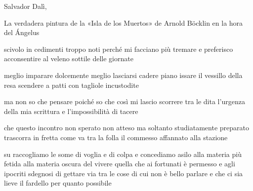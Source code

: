 \clearpage


\begin{artItem}
	Salvador Dalì, \begin{otherlanguage}{spanish}%
		La verdadera pintura de la «Isla de los Muertos» de Arnold Böcklin en la hora del Ángelus%
	\end{otherlanguage}
\end{artItem}

\begin{poem}
	\begin{stanza}
		scivolo in cedimenti troppo noti\verseline
		perché mi facciano più tremare\verseline
		e preferisco acconsentire\verseline
		al veleno sottile delle giornate
	\end{stanza}

	\begin{stanza}
		meglio imparare dolcemente\verseline
		meglio lasciarsi cadere piano\verseline
		issare il vessillo della resa\verseline
		scendere a patti con tagliole incustodite
	\end{stanza}

	\begin{stanza}
		ma non so che pensare\verseline
		poiché so che così mi lascio scorrere tra le dita\verseline
		l'urgenza della mia scrittura\verseline
		e l'impossibilità di tacere
	\end{stanza}
\end{poem}

\clearpage


\begin{poem}
	\begin{stanza}
		che questo incontro\verseline
		non sperato non atteso\verseline
		ma soltanto\verseline
		studiatamente preparato\verseline
		trascorra in fretta\verseline
		come va tra la folla\verseline
		il commesso affannato\verseline
		alla stazione
	\end{stanza}
\end{poem}

\clearpage


\begin{poem}
	\begin{stanza}
		su raccogliamo le some\verseline
		di voglia e di colpa\verseline
		e concediamo asilo\verseline
		alla materia più fetida\verseline
		alla materia oscura del vivere\verseline
		quella che ai fortunati è permesso\verseline
		e agli ipocriti sdegnosi\verseline
		di gettare via tra le cose\verseline
		di cui non è bello parlare\verseline
		e che ci sia lieve il fardello\verseline
		per quanto possibile
	\end{stanza}
\end{poem}

